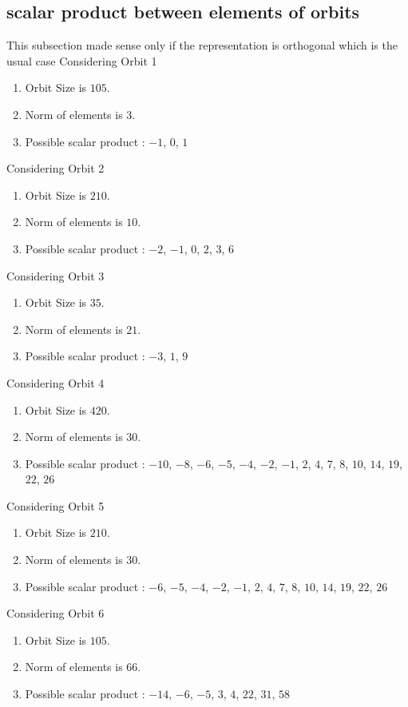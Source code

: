 \documentclass[12pt]{article}
\begin{document}
\subsection{scalar product between elements of orbits}
\noindent This subsection made sense only if the representation is orthogonal which is the usual case
Considering Orbit 1
\begin{enumerate}
\item Orbit Size is $105$.
\item Norm of elements is $3$.
\item Possible scalar product : $-1$, $0$, $1$
\end{enumerate}
Considering Orbit 2
\begin{enumerate}
\item Orbit Size is $210$.
\item Norm of elements is $10$.
\item Possible scalar product : $-2$, $-1$, $0$, $2$, $3$, $6$
\end{enumerate}
Considering Orbit 3
\begin{enumerate}
\item Orbit Size is $35$.
\item Norm of elements is $21$.
\item Possible scalar product : $-3$, $1$, $9$
\end{enumerate}
Considering Orbit 4
\begin{enumerate}
\item Orbit Size is $420$.
\item Norm of elements is $30$.
\item Possible scalar product : $-10$, $-8$, $-6$, $-5$, $-4$, $-2$, $-1$, $2$, $4$, $7$, $8$, $10$, $14$, $19$, $22$, $26$
\end{enumerate}
Considering Orbit 5
\begin{enumerate}
\item Orbit Size is $210$.
\item Norm of elements is $30$.
\item Possible scalar product : $-6$, $-5$, $-4$, $-2$, $-1$, $2$, $4$, $7$, $8$, $10$, $14$, $19$, $22$, $26$
\end{enumerate}
Considering Orbit 6
\begin{enumerate}
\item Orbit Size is $105$.
\item Norm of elements is $66$.
\item Possible scalar product : $-14$, $-6$, $-5$, $3$, $4$, $22$, $31$, $58$
\end{enumerate}
\end{document}
